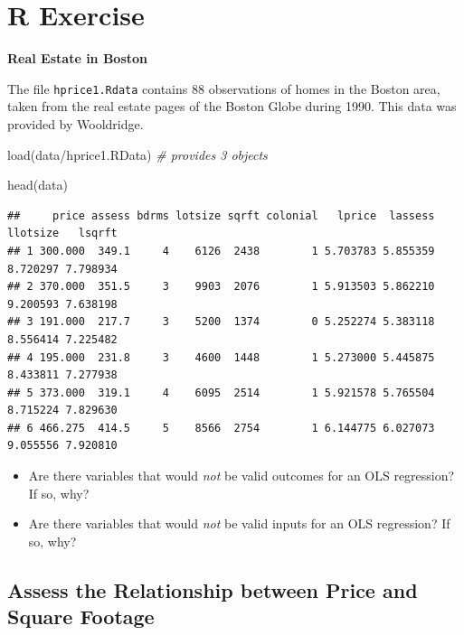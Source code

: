 \documentclass[
]{book}
\newenvironment{Shaded}{\begin{snugshade}}{\end{snugshade}}
\newcommand{\CommentTok}[1]{\textcolor[rgb]{0.56,0.35,0.01}{\textit{#1}}}
\newcommand{\FunctionTok}[1]{\textcolor[rgb]{0.00,0.00,0.00}{#1}}
\newcommand{\NormalTok}[1]{#1}
\newcommand{\StringTok}[1]{\textcolor[rgb]{0.31,0.60,0.02}{#1}}
\providecommand{\tightlist}{%
  \setlength{\itemsep}{0pt}\setlength{\parskip}{0pt}}
\theoremstyle{definition}
\theoremstyle{definition}
\theoremstyle{definition}
\theoremstyle{definition}
\theoremstyle{remark}
\begin{document}
\hypertarget{r-exercise}{%
\section{R Exercise}\label{r-exercise}}

\textbf{Real Estate in Boston}

The file \texttt{hprice1.Rdata} contains 88 observations of homes in the Boston area, taken from the real estate pages of the Boston Globe during 1990. This data was provided by Wooldridge.

\begin{Shaded}
\begin{Highlighting}[]
\FunctionTok{load}\NormalTok{(}\StringTok{\textquotesingle{}data/hprice1.RData\textquotesingle{}}\NormalTok{) }\CommentTok{\# provides 3 objects }
\end{Highlighting}
\end{Shaded}

\begin{Shaded}
\begin{Highlighting}[]
\FunctionTok{head}\NormalTok{(data)}
\end{Highlighting}
\end{Shaded}

\begin{verbatim}
##     price assess bdrms lotsize sqrft colonial   lprice  lassess llotsize   lsqrft
## 1 300.000  349.1     4    6126  2438        1 5.703783 5.855359 8.720297 7.798934
## 2 370.000  351.5     3    9903  2076        1 5.913503 5.862210 9.200593 7.638198
## 3 191.000  217.7     3    5200  1374        0 5.252274 5.383118 8.556414 7.225482
## 4 195.000  231.8     3    4600  1448        1 5.273000 5.445875 8.433811 7.277938
## 5 373.000  319.1     4    6095  2514        1 5.921578 5.765504 8.715224 7.829630
## 6 466.275  414.5     5    8566  2754        1 6.144775 6.027073 9.055556 7.920810
\end{verbatim}

\begin{itemize}
\tightlist
\item
  Are there variables that would \emph{not} be valid outcomes for an OLS regression? If so, why?
\item
  Are there variables that would \emph{not} be valid inputs for an OLS regression? If so, why?
\end{itemize}

\hypertarget{assess-the-relationship-between-price-and-square-footage}{%
\subsection{Assess the Relationship between Price and Square Footage}\label{assess-the-relationship-between-price-and-square-footage}}
\end{document}
